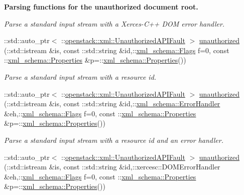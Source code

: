 \begin{Indent}{\bf Parsing functions for the unauthorized document root.}
\begin{DoxyCompactItemize}
\begin{DoxyCompactList}\small\item\em Parse a standard input stream with a Xerces-\/C++ DOM error handler. \item\end{DoxyCompactList}\item 
::std::auto\_\-ptr$<$ ::\hyperlink{classopenstack_1_1xml_1_1UnauthorizedAPIFault}{openstack::xml::UnauthorizedAPIFault} $>$ \hyperlink{namespaceopenstack_1_1xml_acb85d689c78624f60888cf0f7e3b17e1}{unauthorized} (::std::istream \&is, const ::std::string \&id,::\hyperlink{namespacexml__schema_affb4c227cbd9aa7453dd1dc5a1401943}{xml\_\-schema::Flags} f=0, const ::\hyperlink{namespacexml__schema_ad27ce19a7ee1d3b1064092648898f64c}{xml\_\-schema::Properties} \&p=::\hyperlink{namespacexml__schema_ad27ce19a7ee1d3b1064092648898f64c}{xml\_\-schema::Properties}())
\begin{DoxyCompactList}\small\item\em Parse a standard input stream with a resource id. \item\end{DoxyCompactList}\item 
::std::auto\_\-ptr$<$ ::\hyperlink{classopenstack_1_1xml_1_1UnauthorizedAPIFault}{openstack::xml::UnauthorizedAPIFault} $>$ \hyperlink{namespaceopenstack_1_1xml_a37e4eb108cb9a51df3ddf551045cf0a1}{unauthorized} (::std::istream \&is, const ::std::string \&id,::\hyperlink{namespacexml__schema_ab1c9361bfd3b404eaabf0c31eded79dc}{xml\_\-schema::ErrorHandler} \&eh,::\hyperlink{namespacexml__schema_affb4c227cbd9aa7453dd1dc5a1401943}{xml\_\-schema::Flags} f=0, const ::\hyperlink{namespacexml__schema_ad27ce19a7ee1d3b1064092648898f64c}{xml\_\-schema::Properties} \&p=::\hyperlink{namespacexml__schema_ad27ce19a7ee1d3b1064092648898f64c}{xml\_\-schema::Properties}())
\begin{DoxyCompactList}\small\item\em Parse a standard input stream with a resource id and an error handler. \item\end{DoxyCompactList}\item 
::std::auto\_\-ptr$<$ ::\hyperlink{classopenstack_1_1xml_1_1UnauthorizedAPIFault}{openstack::xml::UnauthorizedAPIFault} $>$ \hyperlink{namespaceopenstack_1_1xml_a0ab6e8579c4b8960528530315a945737}{unauthorized} (::std::istream \&is, const ::std::string \&id,::xercesc::DOMErrorHandler \&eh,::\hyperlink{namespacexml__schema_affb4c227cbd9aa7453dd1dc5a1401943}{xml\_\-schema::Flags} f=0, const ::\hyperlink{namespacexml__schema_ad27ce19a7ee1d3b1064092648898f64c}{xml\_\-schema::Properties} \&p=::\hyperlink{namespacexml__schema_ad27ce19a7ee1d3b1064092648898f64c}{xml\_\-schema::Properties}())

\end{DoxyCompactItemize}
\end{Indent}
